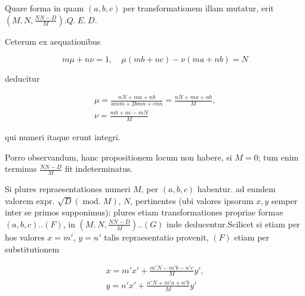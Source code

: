 Quare forma in quam $(a,b,c)$ per transformationem illam mutatur, erit $(M,N,\frac{NN-D}{M})$.\quad $Q.\ E.\ D.$

Ceterum ex aequationibus

\[
m\mu+n\nu=1,\quad \mu(mb+nc)-\nu(ma+nb)=N
\]

deducitur

\[
\begin{gathered}\mu=\frac{nN+ma+nb}{amm+2bmn+cnn}=\frac{nN+ma+nb}{M},\\\nu=\frac{mb+nc-mN}{M}\end{gathered}
\]

qui numeri itaque erunt integri.

Porro observandum, hanc propositionem locum non habere, si $M=0$; tum enim terminus $\frac{NN-D}{M}$ fit indeterminatus.


Si plures repraesentationes numeri $M$, per $(a,b,c)$ habentur. ad eundem valorem expr. $\surd D(\operatorname{mod.}M)$, $N$, pertinentes (ubi valores ipsorum $x,y$ semper inter se primos supponimus): plures etiam transformationes propriae formae $(a,b,c)..(F)$, in $(M.\ N,\frac{NN-D}{M})..(G)$ inde deducentur.\quad Scilicet si etiam per hos valores $x=m'$, $y=n'$ talis repraesentatio provenit, $(F)$ etiam per substitutionem


\[
\begin{gathered}x=m'x'+\frac{m'N-m'b-n'c}{M}y',\\y=n'x'+\frac{n'N+m'a+n'b}{M}y'\end{gathered}
\]

